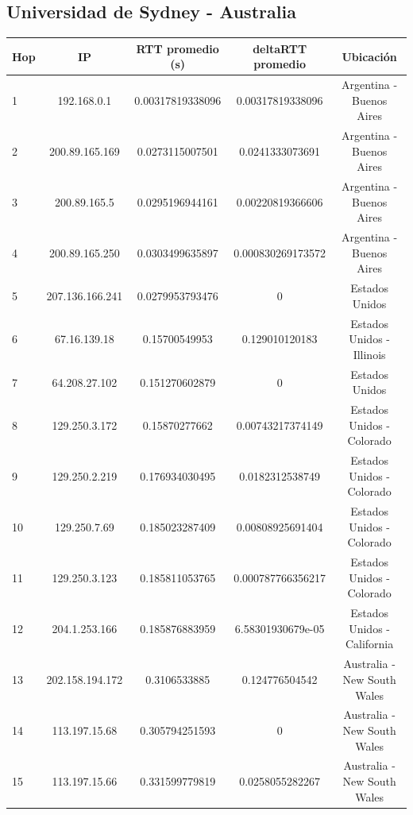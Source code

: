 \subsection{Universidad de Sydney - Australia}

\bigskip

\begin{tabular}{ | l | c | c | c | c |}
 
  \hline                 
  Hop & IP &  RTT promedio (s)  & deltaRTT promedio & Ubicación\\
  \hline
  1  &  192.168.0.1  &  0.00317819338096  &  0.00317819338096 & Argentina - Buenos Aires\\
  \hline
  2  &  200.89.165.169  &  0.0273115007501  &  0.0241333073691 & Argentina - Buenos Aires\\
  \hline
  3  &  200.89.165.5  &  0.0295196944161  &  0.00220819366606 & Argentina - Buenos Aires\\
  \hline
  4  &  200.89.165.250  &  0.0303499635897  &  0.000830269173572 & Argentina - Buenos Aires\\
  \hline
  5  &  207.136.166.241  &  0.0279953793476  &  0 & Estados Unidos\\
  \hline
  6  &  67.16.139.18  &  0.15700549953  &  0.129010120183 & Estados Unidos - Illinois\\
  \hline
  7  &  64.208.27.102  &  0.151270602879  &  0 & Estados Unidos\\
  \hline
  8  &  129.250.3.172  &  0.15870277662  &  0.00743217374149 & Estados Unidos - Colorado\\
  \hline
  9  &  129.250.2.219  &  0.176934030495  &  0.0182312538749 & Estados Unidos - Colorado\\
  \hline
  10  &  129.250.7.69  &  0.185023287409  &  0.00808925691404 & Estados Unidos - Colorado\\
  \hline
  11  &  129.250.3.123  &  0.185811053765  &  0.000787766356217 & Estados Unidos - Colorado\\
  \hline
  12  &  204.1.253.166  &  0.185876883959  &  6.58301930679e-05 & Estados Unidos - California\\
  \hline
  13  &  202.158.194.172  &  0.3106533885  &  0.124776504542 & Australia - New South Wales\\
  \hline
  14  &  113.197.15.68  &  0.305794251593  &  0 & Australia - New South Wales\\
  \hline
  15  &  113.197.15.66  &  0.331599779819  &  0.0258055282267 & Australia - New South Wales\\

\end{tabular}
